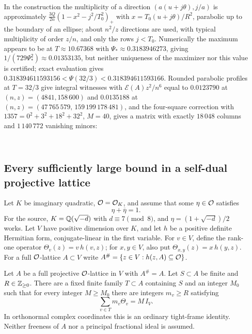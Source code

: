 In the construction the multiplicity of a direction $(a(u+j\theta),j/a)$ is approximately
$\frac{3Q}{2n}(1-x^2-j^2/T_0^2)_+$ with $x=T_0(u+j\theta)/R^2$, parabolic up to the boundary of an ellipse; about
$n^2/z$ directions are used, with typical multiplicity of order $z/n$, and only the rows $j<T_0$. Numerically the
maximum appears to be at $T\approx10.67368$ with $\Psi_*\approx0.3183946273$, giving
$1/(729\Psi_*^2)\approx0.01353135$, but neither uniqueness of the maximizer nor this value is certified; exact
evaluation gives $0.318394611593156<\Psi(32/3)<0.318394611593166$. Rounded parabolic profiles at $T=32/3$ give
integral witnesses with $\mathcal E(A)z^2/n^6$ equal to $0.0123790$ at $(n,z)=(4841,158\,600)$ and $0.0135188$ at
$(n,z)=(47\,765\,579,\,159\,199\,178\,481)$, and the four-square correction with $1357=0^2+3^2+18^2+32^2$, $M=40$,
gives a matrix with exactly $18\,048$ columns and $1\,140\,772$ vanishing minors:
\begin{center}\small
{}\\
\end{center}

\subsection{Every sufficiently large bound in a self-dual projective lattice}\label{spn:sec:projective}

Let $K$ be imaginary quadratic, $\mathcal{O}=\mathcal{O}_K$, and assume that some
$\eta\in\mathcal{O}$ satisfies
\begin{equation}\label{spn:eq:traceone}
 \eta+\overline\eta=1 .
\end{equation}
For the source, $K=\mathbb{Q}(\sqrt{-d})$ with $d\equiv7\pmod8$, and
$\eta=(1+\sqrt{-d})/2$ works. Let $V$ have positive dimension over $K$, and
let $h$ be a positive definite Hermitian form, conjugate-linear in the first
variable. For $v\in V$, define the rank-one operator $\Theta_v(z)=v\,h(v,z)$;
for $x,y\in V$, also put $\Theta_{x,y}(z)=x\,h(y,z)$. For a full
$\mathcal{O}$-lattice $A\subset V$ write
$A^\#=\{z\in V:h(z,A)\subseteq\mathcal{O}\}$.

\begin{theorem}\label{spn:thm:projective}
Let $A$ be a full projective $\mathcal{O}$-lattice in $V$ with $A^\#=A$. Let
$S\subset A$ be finite and $R\in\mathbb{Z}_{\ge0}$. There are a fixed finite family
$T\subset A$ containing $S$ and an integer $M_0$ such that for every integer
$M\ge M_0$ there are integers $m_v\ge R$ satisfying
\begin{equation}\label{spn:eq:projective-frame}
 \sum_{v\in T}m_v\Theta_v=M\,I_V .
\end{equation}
In orthonormal complex coordinates this is an ordinary tight-frame identity.
Neither freeness of $A$ nor a principal fractional ideal is assumed.
\end{theorem}

